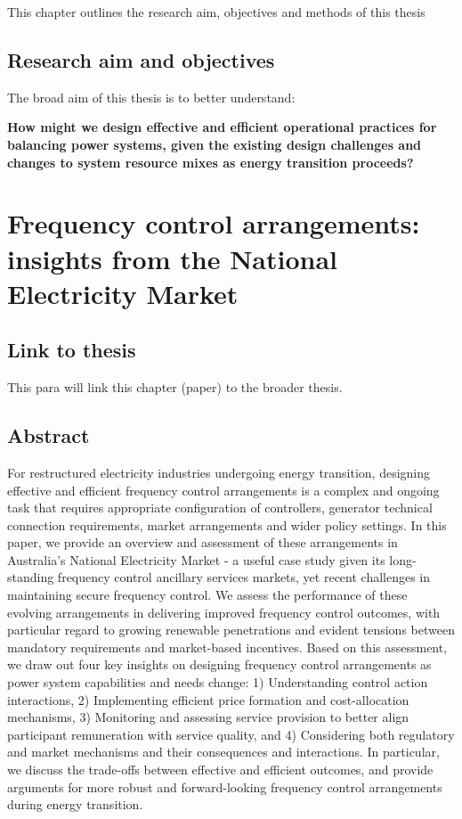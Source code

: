 \documentclass[12pt,a4paper,]{report}
\begin{document}
This chapter outlines the research aim, objectives and methods of this
thesis

\hypertarget{research-aim-and-objectives}{%
\section{Research aim and
objectives}\label{research-aim-and-objectives}}

The broad aim of this thesis is to better understand:

\textbf{\textbf{How might we design effective and efficient operational
practices for balancing power systems, given the existing design
challenges and changes to system resource mixes as energy transition
proceeds?}}

\hypertarget{sec:fcs}{%
\chapter{Frequency control arrangements: insights from the National
Electricity Market}\label{sec:fcs}}

\hypertarget{link-to-thesis}{%
\section{Link to thesis}\label{link-to-thesis}}

This para will link this chapter (paper) to the broader thesis.

\hypertarget{abstract-1}{%
\section{Abstract}\label{abstract-1}}

For restructured electricity industries undergoing energy transition,
designing effective and efficient frequency control arrangements is a
complex and ongoing task that requires appropriate configuration of
controllers, generator technical connection requirements, market
arrangements and wider policy settings. In this paper, we provide an
overview and assessment of these arrangements in Australia's National
Electricity Market - a useful case study given its long-standing
frequency control ancillary services markets, yet recent challenges in
maintaining secure frequency control. We assess the performance of these
evolving arrangements in delivering improved frequency control outcomes,
with particular regard to growing renewable penetrations and evident
tensions between mandatory requirements and market-based incentives.
Based on this assessment, we draw out four key insights on designing
frequency control arrangements as power system capabilities and needs
change: 1) Understanding control action interactions, 2) Implementing
efficient price formation and cost-allocation mechanisms, 3) Monitoring
and assessing service provision to better align participant remuneration
with service quality, and 4) Considering both regulatory and market
mechanisms and their consequences and interactions. In particular, we
discuss the trade-offs between effective and efficient outcomes, and
provide arguments for more robust and forward-looking frequency control
arrangements during energy transition.
\end{document}
